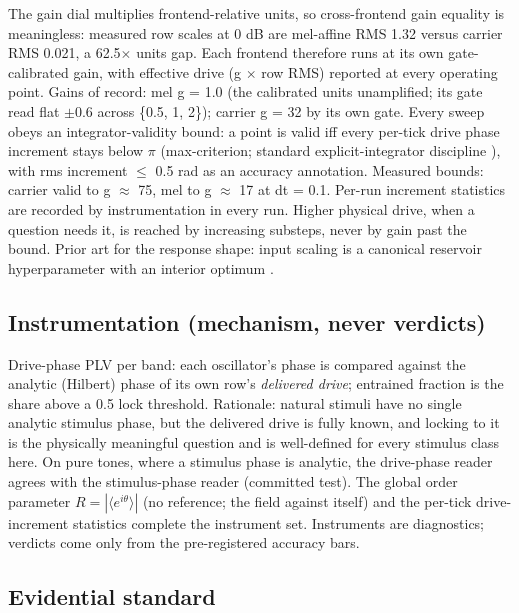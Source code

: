 \documentclass{article}
\begin{document}
The gain dial multiplies frontend-relative units, so cross-frontend gain
equality is meaningless: measured row scales at 0 dB are mel-affine RMS
1.32 versus carrier RMS 0.021, a 62.5\ensuremath{\times} units gap. Each
frontend therefore runs at its own gate-calibrated gain, with effective
drive (g \ensuremath{\times} row RMS) reported at every operating point.
Gains of record: mel g = 1.0 (the calibrated units unamplified; its gate
read flat \ensuremath{\pm}0.6 across \{0.5, 1, 2\}); carrier g = 32 by
its own gate. Every sweep obeys an integrator-validity bound: a point is
valid iff every per-tick drive phase increment stays below
\ensuremath{\pi} (max-criterion; standard explicit-integrator discipline
\citep{hairer1993}), with rms increment \ensuremath{\leq} 0.5 rad as an
accuracy annotation. Measured bounds: carrier valid to g
\ensuremath{\approx} 75, mel to g \ensuremath{\approx} 17 at dt = 0.1.
Per-run increment statistics are recorded by instrumentation in every
run. Higher physical drive, when a question needs it, is reached by
increasing substeps, never by gain past the bound. Prior art for the
response shape: input scaling is a canonical reservoir hyperparameter
with an interior optimum \citep{lukosevicius2012}.

\subsection{Instrumentation (mechanism, never
verdicts)}\label{instrumentation-mechanism-never-verdicts}

Drive-phase PLV per band: each oscillator's phase is compared against
the analytic (Hilbert) phase of its own row's \emph{delivered drive};
entrained fraction is the share above a 0.5 lock threshold. Rationale:
natural stimuli have no single analytic stimulus phase, but the
delivered drive is fully known, and locking to it is the physically
meaningful question and is well-defined for every stimulus class here.
On pure tones, where a stimulus phase is analytic, the drive-phase
reader agrees with the stimulus-phase reader (committed test). The
global order parameter \(R = |\langle e^{i\theta}\rangle|\) (no
reference; the field against itself) and the per-tick drive-increment
statistics complete the instrument set. Instruments are diagnostics;
verdicts come only from the pre-registered accuracy bars.

\subsection{Evidential standard}\label{evidential-standard}
\end{document}
